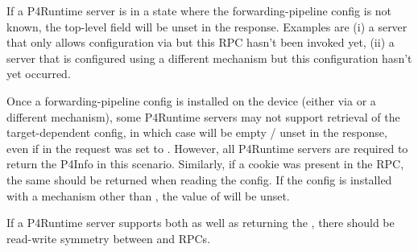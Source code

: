 \documentclass[11pt]{article}
\begin{document}
{%
\noindent{}If a P4Runtime server is in a state where the forwarding-pipeline config is not
known, the top-level  field will be unset in the response. Examples are
(i) a server that only allows configuration via 
but this RPC hasn't been invoked yet, (ii) a server that is configured using a
different mechanism but this configuration hasn't yet occurred.%

Once a forwarding-pipeline config is installed on the device (either via
 or a different mechanism), some P4Runtime servers
may not support retrieval of the target-dependent config, in which case
 will be empty / unset in the response, even if
 in the request was set to . However, all P4Runtime servers
are required to return the P4Info in this scenario. Similarly, if a cookie was
present in the  RPC, the same should be returned
when reading the config. If the config is installed with a mechanism other than
, the value of  will be unset.%

If a P4Runtime server supports both  as well as
returning the , there should be read-write symmetry between
 and  RPCs.%

}
\end{document}
